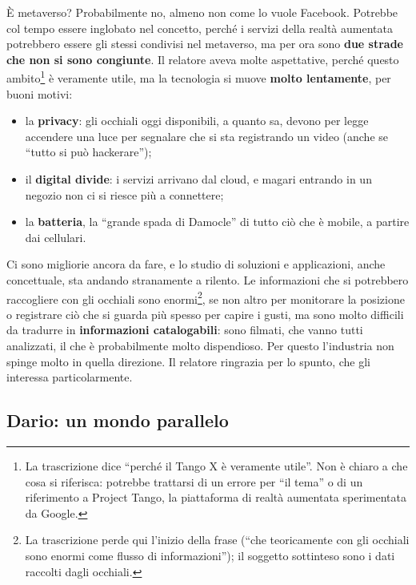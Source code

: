 È metaverso? Probabilmente no, almeno non come lo vuole Facebook. Potrebbe col
tempo essere inglobato nel concetto, perché i servizi della realtà aumentata
potrebbero essere gli stessi condivisi nel metaverso, ma per ora sono
\textbf{due strade che non si sono congiunte}. Il relatore aveva molte
aspettative, perché questo ambito\footnote{La trascrizione dice ``perché il Tango
X è veramente utile''. Non è chiaro a che cosa si riferisca: potrebbe trattarsi
di un errore per ``il tema'' o di un riferimento a Project Tango, la piattaforma
di realtà aumentata sperimentata da Google.} è veramente utile, ma la
tecnologia si muove \textbf{molto lentamente}, per buoni motivi:
\begin{itemize}
  \item la \textbf{privacy}: gli occhiali oggi disponibili, a quanto sa, devono
        per legge accendere una luce per segnalare che si sta registrando un
        video (anche se ``tutto si può hackerare'');
  \item il \textbf{digital divide}: i servizi arrivano dal cloud, e magari
        entrando in un negozio non ci si riesce più a connettere;
  \item la \textbf{batteria}, la ``grande spada di Damocle'' di tutto ciò che è
        mobile, a partire dai cellulari.
\end{itemize}
Ci sono migliorie ancora da fare, e lo studio di soluzioni e applicazioni, anche
concettuale, sta andando stranamente a rilento. Le informazioni che si
potrebbero raccogliere con gli occhiali sono enormi\footnote{La trascrizione
perde qui l'inizio della frase (``che teoricamente con gli occhiali sono enormi
come flusso di informazioni''); il soggetto sottinteso sono i dati raccolti
dagli occhiali.}, se non altro per monitorare la posizione o registrare ciò che
si guarda più spesso per capire i gusti, ma sono molto difficili da tradurre in
\textbf{informazioni catalogabili}: sono filmati, che vanno tutti analizzati, il
che è probabilmente molto dispendioso. Per questo l'industria non spinge molto
in quella direzione. Il relatore ringrazia per lo spunto, che gli interessa
particolarmente.

\subsection{Dario: un mondo parallelo}

